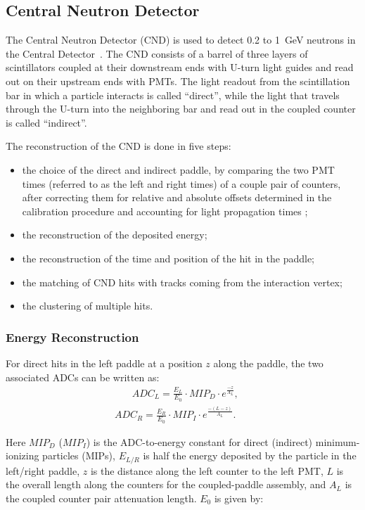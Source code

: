 \subsection{Central Neutron Detector}
\label{sec_rec_cnd}

The Central Neutron Detector (CND) is used to detect 0.2 to 1~GeV neutrons in the Central Detector~\cite{cnd-nim}.
The CND consists of a barrel of three layers of scintillators coupled at their downstream ends with U-turn light
guides and read out on their upstream ends with PMTs. The light readout from the scintillation bar in which a particle
interacts is called ``direct'', while the light that travels through the U-turn into the neighboring bar and read out
in the coupled counter is called ``indirect''. 

The reconstruction of the CND is done in five steps:

\begin{itemize}
\item the choice of the direct and indirect paddle, by comparing the two PMT times (referred to as the left and
  right times) of a couple pair of counters, after correcting them for relative and absolute offsets determined in
  the calibration procedure and accounting for light propagation times \cite{cnd-nim};
\item the reconstruction of the deposited energy;
\item the reconstruction of the time and position of the hit in the paddle;
\item the matching of CND hits with tracks coming from the interaction vertex;
\item the clustering of multiple hits.
\end{itemize}

\subsubsection{Energy Reconstruction}

For direct hits in the left paddle at a position $z$ along the paddle, the two associated ADCs can be written as:
\begin{multline}
\label{eq_adc}
~~~~~~~~ADC_L = \frac{E_L}{E_0} \cdot MIP_D \cdot e^{\frac{-z}{A_L}},\\
ADC_R = \frac{E_R}{E_0} \cdot MIP_I \cdot e^{\frac{-(L-z)}{A_L}}.~~~~~~~
\end{multline}

\noindent
Here $MIP_D$ ($MIP_I$) is the ADC-to-energy constant for direct (indirect) minimum-ionizing particles (MIPs),
$E_{L/R}$ is half the energy deposited by the particle in the left/right paddle, $z$ is the distance along the
left counter to the left PMT, $L$ is the overall length along the counters for the coupled-paddle assembly, and
$A_L$ is the coupled counter pair attenuation length. $E_0$ is given by:

